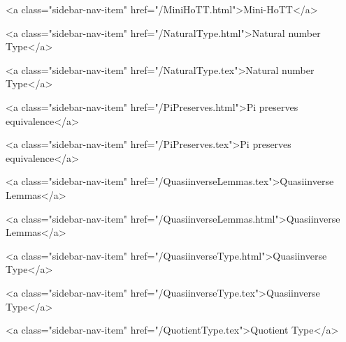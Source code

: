       
        
          <a class="sidebar-nav-item" href="/MiniHoTT.html">Mini-HoTT</a>
        
      
    
      
        
      
    
      
        
          <a class="sidebar-nav-item" href="/NaturalType.html">Natural number Type</a>
        
      
    
      
        
          <a class="sidebar-nav-item" href="/NaturalType.tex">Natural number Type</a>
        
      
    
      
        
          <a class="sidebar-nav-item" href="/PiPreserves.html">Pi preserves equivalence</a>
        
      
    
      
        
          <a class="sidebar-nav-item" href="/PiPreserves.tex">Pi preserves equivalence</a>
        
      
    
      
        
          <a class="sidebar-nav-item" href="/QuasiinverseLemmas.tex">Quasiinverse Lemmas</a>
        
      
    
      
        
          <a class="sidebar-nav-item" href="/QuasiinverseLemmas.html">Quasiinverse Lemmas</a>
        
      
    
      
        
          <a class="sidebar-nav-item" href="/QuasiinverseType.html">Quasiinverse Type</a>
        
      
    
      
        
          <a class="sidebar-nav-item" href="/QuasiinverseType.tex">Quasiinverse Type</a>
        
      
    
      
        
          <a class="sidebar-nav-item" href="/QuotientType.tex">Quotient Type</a>
        
      
    
      
        
